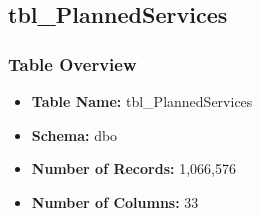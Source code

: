 \begin{landscape}
\subsection{tbl\_PlannedServices}

\subsubsection{Table Overview}
\begin{itemize}
\item \textbf{Table Name:} tbl\_PlannedServices
\item \textbf{Schema:} dbo
\item \textbf{Number of Records:} 1,066,576
\item \textbf{Number of Columns:} 33
\end{itemize}


\end{landscape}
